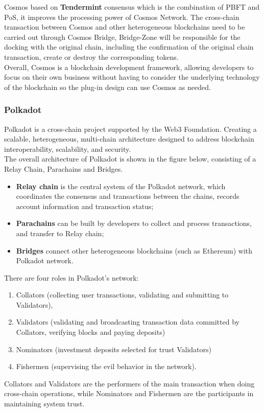 \noindent Cosmos based on \textbf{Tendermint} consensus which is the combination of PBFT and PoS, it improves the processing power of Cosmos Network. The cross-chain transaction between Cosmos and other heterogeneous blockchains need to be carried out through Cosmos Bridge, Bridge-Zone will be responsible for the docking with the original chain, including the confirmation of the original chain transaction, create or destroy the corresponding tokens.\\
\noindent Overall, Cosmos is a blockchain development framework, allowing developers to focus on their own business without having to consider the underlying technology of the blockchain so the plug-in design can use Cosmos as needed.


\subsubsection{Polkadot}
\noindent Polkadot\cite{polkadot} is a cross-chain project supported by the Web3 Foundation. Creating a scalable, heterogeneous, multi-chain architecture designed to address blockchain interoperability, scalability, and security.\\
\noindent The overall architecture of Polkadot is shown in the figure below, consisting of a Relay Chain, Parachains and Bridges. 
\begin{itemize}
    \item \textbf{Relay chain} is the central system of the Polkadot network, which coordinates the consensus and transactions between the chains, records account information and transaction status; 
    \item \textbf{Parachains} can be built by developers to collect and process transactions, and transfer to Relay chain;
    \item \textbf{Bridges} connect other heterogeneous blockchains (such as Ethereum) with Polkadot network.
\end{itemize} 
\noindent There are four roles in Polkadot's network:
\begin{enumerate}
    \item Collators (collecting user transactions, validating and submitting to Validators),
    \item Validators (validating and broadcasting transaction data committed by Collators, verifying blocks and paying deposits)
    \item Nominators (investment deposits selected for trust Validators)
    \item Fishermen (supervising the evil behavior in the network). 
\end{enumerate}
\noindent Collators and Validators are the performers of the main transaction when doing cross-chain operations, while Nominators and Fishermen are the participants in maintaining system trust.\\


